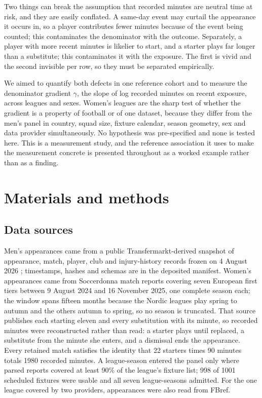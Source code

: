 \documentclass[11pt]{article}
\begin{document}
Two things can break the assumption that recorded minutes are neutral time at risk, and they are easily conflated. A same-day event may curtail the appearance it occurs in, so a player contributes fewer minutes because of the event being counted; this contaminates the denominator with the outcome. Separately, a player with more recent minutes is likelier to start, and a starter plays far longer than a substitute; this contaminates it with the exposure. The first is vivid and the second invisible per row, so they must be separated empirically.

We aimed to quantify both defects in one reference cohort and to measure the denominator gradient $\gamma$, the slope of log recorded minutes on recent exposure, across leagues and sexes. Women's leagues are the sharp test of whether the gradient is a property of football or of one dataset, because they differ from the men's panel in country, squad size, fixture calendar, season geometry, sex and data provider simultaneously. No hypothesis was pre-specified and none is tested here. This is a measurement study, and the reference association it uses to make the measurement concrete is presented throughout as a worked example rather than as a finding.

\section{Materials and methods}

\subsection{Data sources}

Men's appearances came from a public Transfermarkt-derived snapshot of appearance, match, player, club and injury-history records frozen on 4 August 2026 \cite{dcaribou_transfermarkt_datasets}; timestamps, hashes and schemas are in the deposited manifest. Women's appearances came from Soccerdonna match reports covering seven European first tiers between 9 August 2024 and 16 November 2025, one complete season each; the window spans fifteen months because the Nordic leagues play spring to autumn and the others autumn to spring, so no season is truncated. That source publishes each starting eleven and every substitution with its minute, so recorded minutes were reconstructed rather than read: a starter plays until replaced, a substitute from the minute she enters, and a dismissal ends the appearance. Every retained match satisfies the identity that 22 starters times 90 minutes totals 1980 recorded minutes. A league-season entered the panel only where parsed reports covered at least 90\% of the league's fixture list; 998 of 1001 scheduled fixtures were usable and all seven league-seasons admitted. For the one league covered by two providers, appearances were also read from FBref.
\end{document}
